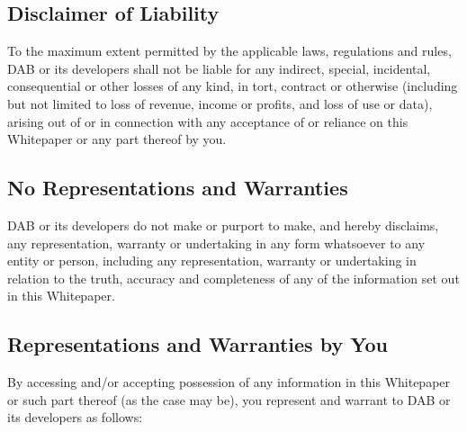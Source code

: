 \documentclass[review]{elsarticle}
\begin{document}
\subsection{Disclaimer of Liability}
To the maximum extent permitted by the applicable laws, regulations and rules, DAB or its developers shall not be liable for any indirect, special, incidental, consequential or other losses of any kind, in tort, contract or otherwise (including but not limited to loss of revenue, income or profits, and loss of use or data), arising out of or in connection with any acceptance of or reliance on this Whitepaper or any part thereof by you. 

\subsection{No Representations and Warranties}
DAB or its developers do not make or purport to make, and hereby disclaims, any representation, warranty or undertaking in any form whatsoever to any entity or person, including any representation, warranty or undertaking in relation to the truth, accuracy and completeness of any of the information set out in this Whitepaper. 

\subsection{Representations and Warranties by You}
By accessing and/or accepting possession of any information in this Whitepaper or such part thereof (as the case may be), you represent and warrant to DAB or its developers as follows: 
\end{document}
